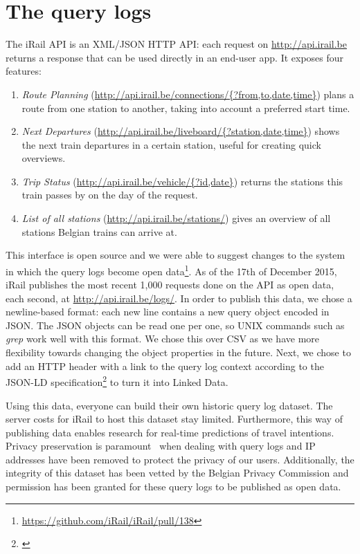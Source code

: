 \documentclass{sig-alternate}
\begin{document}
\section{The query logs}
\label{sec:logs}

The iRail API is an XML/JSON HTTP API: each request on \url{http://api.irail.be} returns a response that can be used directly in an end-user app.
It exposes four features: 
\begin{enumerate}
\item \emph{Route Planning} (\url{http://api.irail.be/connections/{?from,to,date,time}}) plans a route from one station to another, taking into account a preferred start time.
\item \emph{Next Departures} (\url{http://api.irail.be/liveboard/{?station,date,time}}) shows the next train departures in a certain station, useful for creating quick overviews.
\item \emph{Trip Status} (\url{http://api.irail.be/vehicle/{?id,date}}) returns the stations this train passes by on the day of the request.
\item \emph{List of all stations} (\url{http://api.irail.be/stations/}) gives an overview of all stations Belgian trains can arrive at.
\end{enumerate}

This interface is open source and we were able to suggest changes to the system in which the query logs become open data\footnote{\url{https://github.com/iRail/iRail/pull/138}}.
As of the 17th of December 2015, iRail publishes the most recent 1,000 requests done on the API as open data, each second, at \url{http://api.irail.be/logs/}.
In order to publish this data, we chose a newline-based format: each new line contains a new query object encoded in JSON. 
The JSON objects can be read one per one, so UNIX commands such as \emph{grep} work well with this format.
We chose this over CSV as we have more flexibility towards changing the object properties in the future.
Next, we chose to add an HTTP header with a link to the query log context according to the JSON-LD specification\footnote{\url{}} to turn it into Linked Data.

Using this data, everyone can build their own historic query log dataset.
The server costs for iRail to host this dataset stay limited.
Furthermore, this way of publishing data enables research for real-time predictions of travel intentions.
Privacy preservation is paramount~\cite{silvestri} when dealing with query logs and IP addresses have been removed to protect the privacy of our users. 
Additionally, the integrity of this dataset has been vetted by the Belgian Privacy Commission and permission has been granted for these query logs to be published as open data.
\end{document}
